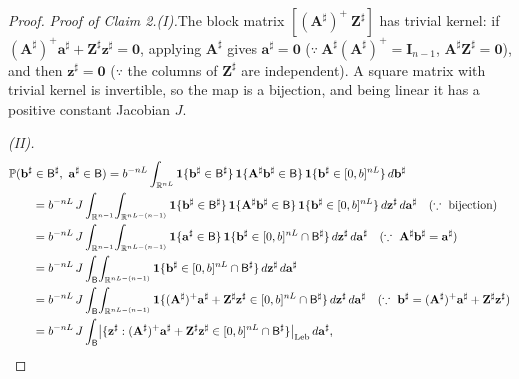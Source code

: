 \documentclass[11pt]{article}
\theoremstyle{definition}
\begin{document}
\begin{proof}
\noindent\emph{Proof of Claim 2.}\quad \textit{(I).}\quad The block matrix $[(\mathbf{A}^{\sharp})^{+}\ \mathbf{Z}^{\sharp}]$ has trivial kernel: if $(\mathbf{A}^{\sharp})^{+}\mathbf{a}^{\sharp}+\mathbf{Z}^{\sharp}\mathbf{z}^{\sharp} = \mathbf{0}$, applying $\mathbf{A}^{\sharp}$ gives $\mathbf{a}^{\sharp} = \mathbf{0}$ ($\because\ \mathbf{A}^{\sharp}(\mathbf{A}^{\sharp})^{+} = \mathbf{I}_{n-1}$, $\mathbf{A}^{\sharp}\mathbf{Z}^{\sharp} = \mathbf{0}$), and then $\mathbf{z}^{\sharp} = \mathbf{0}$ ($\because$ the columns of $\mathbf{Z}^{\sharp}$ are independent). A square matrix with trivial kernel is invertible, so the map is a bijection, and being linear it has a positive constant Jacobian $J$.

\smallskip\noindent\textit{(II).}
\begin{align*}
\MoveEqLeft[2] \mathbb{P}(\mathbf{b}^{\sharp}\in\mathsf{B}^{\sharp},\ \mathbf{a}^{\sharp}\in\mathsf{B})
= b^{-nL}\int_{\mathbb{R}^{nL}} \mathbf{1}\{\mathbf{b}^{\sharp}\in\mathsf{B}^{\sharp}\}\,\mathbf{1}\{\mathbf{A}^{\sharp}\mathbf{b}^{\sharp}\in\mathsf{B}\}\,\mathbf{1}\{\mathbf{b}^{\sharp}\in[0,b]^{nL}\}\,d\mathbf{b}^{\sharp} \\
&= b^{-nL}\,J\int_{\mathbb{R}^{n-1}}\!\int_{\mathbb{R}^{nL-(n-1)}} \mathbf{1}\{\mathbf{b}^{\sharp}\in\mathsf{B}^{\sharp}\}\,\mathbf{1}\{\mathbf{A}^{\sharp}\mathbf{b}^{\sharp}\in\mathsf{B}\}\,\mathbf{1}\{\mathbf{b}^{\sharp}\in[0,b]^{nL}\}\,d\mathbf{z}^{\sharp}\,d\mathbf{a}^{\sharp}
     \quad (\because\ \text{bijection}) \\
&= b^{-nL}\,J \int_{\mathbb{R}^{n-1}}\!\int_{\mathbb{R}^{nL-(n-1)}} \mathbf{1}\{\mathbf{a}^{\sharp}\in\mathsf{B}\}\,\mathbf{1}\{\mathbf{b}^{\sharp}\in[0,b]^{nL}\cap\mathsf{B}^{\sharp}\}\,d\mathbf{z}^{\sharp}\,d\mathbf{a}^{\sharp}
     \quad (\because\ \mathbf{A}^{\sharp}\mathbf{b}^{\sharp}=\mathbf{a}^{\sharp}) \\
&= b^{-nL}\,J \int_{\mathsf{B}}\!\int_{\mathbb{R}^{nL-(n-1)}} \mathbf{1}\{\mathbf{b}^{\sharp}\in[0,b]^{nL}\cap\mathsf{B}^{\sharp}\}\,d\mathbf{z}^{\sharp}\,d\mathbf{a}^{\sharp} \\
&= b^{-nL}\,J \int_{\mathsf{B}}\!\int_{\mathbb{R}^{nL-(n-1)}} \mathbf{1}\{(\mathbf{A}^{\sharp})^{+}\mathbf{a}^{\sharp}+\mathbf{Z}^{\sharp}\mathbf{z}^{\sharp}\in[0,b]^{nL}\cap\mathsf{B}^{\sharp}\}\,d\mathbf{z}^{\sharp}\,d\mathbf{a}^{\sharp}
     \quad (\because\ \mathbf{b}^{\sharp}=(\mathbf{A}^{\sharp})^{+}\mathbf{a}^{\sharp}+\mathbf{Z}^{\sharp}\mathbf{z}^{\sharp}) \\
&= b^{-nL}\,J \int_{\mathsf{B}} \bigl|\{\mathbf{z}^{\sharp} : (\mathbf{A}^{\sharp})^{+}\mathbf{a}^{\sharp}+\mathbf{Z}^{\sharp}\mathbf{z}^{\sharp}\in[0,b]^{nL}\cap\mathsf{B}^{\sharp}\}\bigr|_{\mathrm{Leb}}\,d\mathbf{a}^{\sharp},

\end{align*}
\end{proof}
\end{document}
